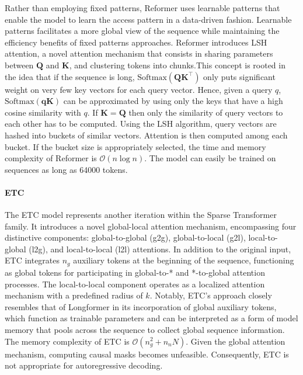Rather than employing fixed patterns, Reformer \citep{kitaev2020reformer} uses learnable patterns that enable the model to learn the access pattern in a data-driven fashion. Learnable patterns facilitates a more global view of the sequence while maintaining the efficiency benefits of fixed patterns approaches. Reformer introduces \ac{LSH} attention, a novel attention mechanism that consists in sharing parameters between $\bm{Q}$ and $\bm{K}$, and clustering tokens into chunks.This concept is rooted in the idea that if the sequence is long, $\text{Softmax}(\bm{Q}\bm{K}^{\top})$ only puts significant weight on very few key vectors for each query vector. Hence, given a query $q$, $\text{Softmax}(\bm{qK})$ can be approximated by using only the keys that have a high cosine similarity with $q$. If $\bm{K} = \bm{Q}$ then only the similarity of query vectors to each other has to be computed. Using the LSH algorithm, query vectors are hashed into buckets of similar vectors. Attention is then computed among each bucket. If the bucket size is appropriately selected, the time and memory complexity of Reformer is $\mathcal{O}(n \log n)$. The model can easily be trained on sequences as long as 64000 tokens.

\paragraph{ETC}

The \ac{ETC} model \citep{ainslie2020etc} represents another iteration within the Sparse Transformer family. It introduces a novel global-local attention mechanism, encompassing four distinctive components: global-to-global (g2g), global-to-local (g2l), local-to-global (l2g), and local-to-local (l2l) attentions. In addition to the original input, ETC integrates $n_g$ auxiliary tokens at the beginning of the sequence, functioning as global tokens for participating in global-to-* and *-to-global attention processes. The local-to-local component operates as a localized attention mechanism with a predefined radius of $k$. Notably, \ac{ETC}'s approach closely resembles that of Longformer in its incorporation of global auxiliary tokens, which function as trainable parameters and can be interpreted as a form of model memory that pools across the sequence to collect global sequence information. The memory complexity of \ac{ETC} is $\mathcal{O}(n_g^2 + n_n N)$. Given the global attention mechanism, computing causal masks becomes unfeasible. Consequently, \ac{ETC} is not appropriate for autoregressive decoding.

